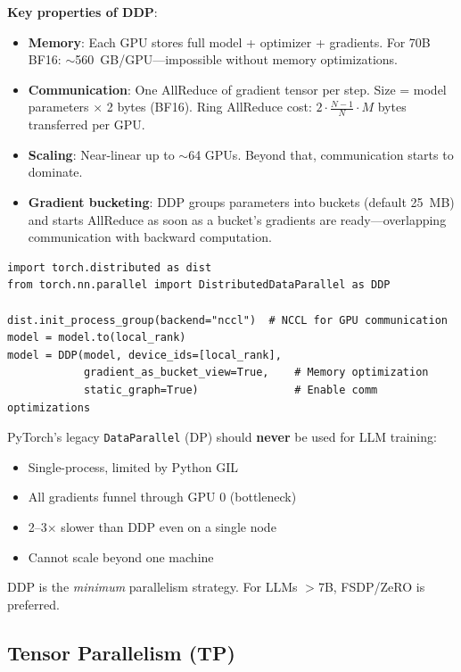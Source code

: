 \textbf{Key properties of DDP}:

\begin{itemize}
  \item \textbf{Memory}: Each GPU stores full model + optimizer + gradients. For 70B BF16: $\sim$560~GB/GPU---impossible without memory optimizations.
  \item \textbf{Communication}: One AllReduce of gradient tensor per step. Size = model parameters $\times$ 2 bytes (BF16). Ring AllReduce cost: $2 \cdot \frac{N-1}{N} \cdot M$ bytes transferred per GPU.
  \item \textbf{Scaling}: Near-linear up to $\sim$64 GPUs. Beyond that, communication starts to dominate.
  \item \textbf{Gradient bucketing}: DDP groups parameters into buckets (default 25~MB) and starts AllReduce as soon as a bucket’s gradients are ready---overlapping communication with backward computation.
\end{itemize}

\begin{lstlisting}[style=pythonstyle]
import torch.distributed as dist
from torch.nn.parallel import DistributedDataParallel as DDP

dist.init_process_group(backend="nccl")  # NCCL for GPU communication
model = model.to(local_rank)
model = DDP(model, device_ids=[local_rank],
            gradient_as_bucket_view=True,    # Memory optimization
            static_graph=True)               # Enable comm optimizations
\end{lstlisting}

\begin{warningbox}
PyTorch’s legacy \texttt{DataParallel} (DP) should \textbf{never} be used for LLM training:

\begin{itemize}
  \item Single-process, limited by Python GIL
  \item All gradients funnel through GPU 0 (bottleneck)
  \item 2--3$\times$ slower than DDP even on a single node
  \item Cannot scale beyond one machine
\end{itemize}

DDP is the \emph{minimum} parallelism strategy. For LLMs $>$7B, FSDP/ZeRO is preferred.
\end{warningbox}

\subsection{Tensor Parallelism (TP)}
\label{subsec:tensor-parallel}

